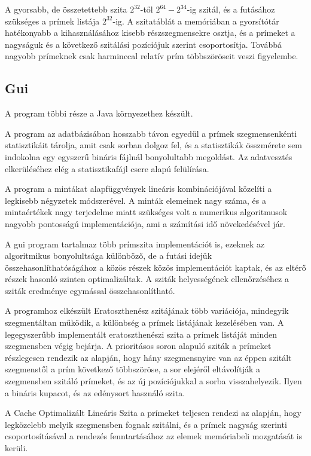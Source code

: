 A gyorsabb, de összetettebb szita $2^{32}$-től $2^{64}-2^{34}$-ig szitál,
és a futásához szükséges a prímek listája $2^{32}$-ig.
A szitatáblát a memóriában a gyorsítótár hatékonyabb a kihasználásához kisebb
részszegmensekre osztja,
és a prímeket a nagyságuk és a következő szitálási pozíciójuk szerint csoportosítja.
Továbbá nagyobb prímeknek csak harminccal relatív prím többszöröseit veszi figyelembe.

\subsection{Gui}

A program többi része a Java környezethez készült.

A program az adatbázisában hosszabb távon egyedül a prímek szegmensenkénti statisztikáit tárolja,
amit csak sorban dolgoz fel, és a statisztikák összmérete sem indokolna egy egyszerű bináris fájlnál bonyolultabb megoldást.
Az adatvesztés elkerüléséhez elég a statisztikafájl csere alapú felülírása.

A program a mintákat alapfüggvények lineáris kombinációjával közelíti a legkisebb négyzetek módszerével. A minták elemeinek nagy száma, és a mintaértékek
nagy terjedelme miatt szükséges volt a numerikus algoritmusok nagyobb pontosságú
implementációja, ami a számítási idő növekedésével jár.

A gui program tartalmaz több prímszita implementációt is, ezeknek az algoritmikus
bonyolultsága különböző, de a futási idejük összehasonlíthatóságához a közös részek közös
implementációt kaptak, és az eltérő részek hasonló szinten optimalizáltak.
A sziták helyességének ellenőrzéséhez a sziták eredménye egymással összehasonlítható.

A programhoz elkészült Eratoszthenész szitájának több variációja, mindegyik szegmentáltan működik,
a különbség a prímek listájának kezelésében van.
A legegyszerűbb implementált eratoszthenészi szita a prímek listáját minden szegmensben végig bejárja.
A prioritásos soron alapuló sziták a prímeket részlegesen rendezik az alapján, hogy hány szegmensnyire van az éppen szitált szegmenstől a prím következő többszöröse, a sor elejéről eltávolítják a szegmensben szitáló prímeket, és az új pozíciójukkal a sorba visszahelyezik.
Ilyen a bináris kupacot, és az edénysort használó szita.

A Cache Optimalizált Lineáris Szita a prímeket teljesen rendezi az alapján, hogy legközelebb melyik szegmensben fognak szitálni, és a prímek nagyság szerinti csoportosításával a rendezés fenntartásához az elemek memóriabeli mozgatását is kerüli.

